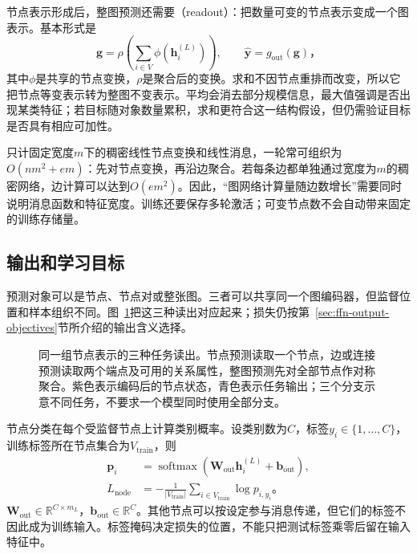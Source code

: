节点表示形成后，整图预测还需要（readout）：把数量可变的节点表示变成一个图表示。基本形式是
\begin{equation}
  \bm{g}=\rho\!\left(\sum_{i\in V}\phi(\bm{h}_i^{(L)})\right),
  \qquad \widehat{\bm{y}}=g_{\mathrm{out}}(\bm{g})\text{，}
  \label{eq:gnn-readout}
\end{equation}
其中$\phi$是共享的节点变换，$\rho$是聚合后的变换。求和不因节点重排而改变，所以它把节点等变表示转为整图不变表示。平均会消去部分规模信息，最大值强调是否出现某类特征；若目标随对象数量累积，求和更符合这一结构假设，但仍需验证目标是否具有相应可加性。

只计固定宽度$m$下的稠密线性节点变换和线性消息，一轮常可组织为$O(nm^2+em)$：先对节点变换，再沿边聚合。若每条边都单独通过宽度为$m$的稠密网络，边计算可以达到$O(em^2)$。因此，“图网络计算量随边数增长”需要同时说明消息函数和特征宽度。训练还要保存多轮激活；可变节点数不会自动带来固定的训练存储量。

\subsection{输出和学习目标}
\label{sec:gnn-output-objectives}

预测对象可以是节点、节点对或整张图。三者可以共享同一个图编码器，但监督位置和样本组织不同。图~\ref{fig:gnn-output-levels}把这三种读出对应起来；损失仍按第~\ref{sec:ffn-output-objectives}节所介绍的输出含义选择。

\begin{figure}[htb]
  \centering
  
  \caption{同一组节点表示的三种任务读出。节点预测读取一个节点，边或连接预测读取两个端点及可用的关系属性，整图预测先对全部节点作对称聚合。紫色表示编码后的节点状态，青色表示任务输出；三个分支示意不同任务，不要求一个模型同时使用全部分支。}
  \label{fig:gnn-output-levels}
\end{figure}

节点分类在每个受监督节点上计算类别概率。设类别数为$C$，标签$y_i\in\{1,\ldots,C\}$，训练标签所在节点集合为$V_{\mathrm{train}}$，则
\begin{equation}
  \begin{aligned}
    \bm{p}_i&=\operatorname{softmax}(\bm{W}_{\mathrm{out}}\bm{h}_i^{(L)}+\bm{b}_{\mathrm{out}}),\\
    L_{\mathrm{node}}&=-\frac{1}{|V_{\mathrm{train}}|}
      \sum_{i\in V_{\mathrm{train}}}\log p_{i,y_i}\text{。}
  \end{aligned}
  \label{eq:gnn-node-loss}
\end{equation}
$\bm{W}_{\mathrm{out}}\in\mathbb{R}^{C\times m_L}$，$\bm{b}_{\mathrm{out}}\in\mathbb{R}^{C}$。其他节点可以按设定参与消息传递，但它们的标签不因此成为训练输入。标签掩码决定损失的位置，不能只把测试标签乘零后留在输入特征中。

